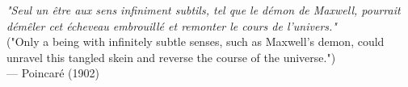 \begin{flushright}
\emph{"Seul un être aux sens infiniment subtils, tel que le démon de Maxwell, pourrait démêler cet écheveau embrouillé et remonter le cours de l’univers."} \\  
("Only a being with infinitely subtle senses, such as Maxwell’s demon, could unravel this tangled skein and reverse the course of the universe.") \\
 — Poincaré (1902)
\end{flushright}
